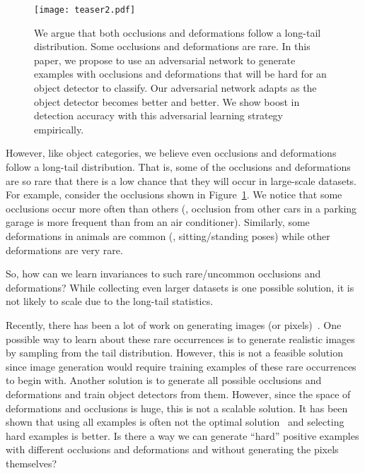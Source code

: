\documentclass[10pt,twocolumn,letterpaper]{article}
\begin{document}
\begin{figure}
    \centering
    \vspace{-0.25in}
    \texttt{[image: teaser2.pdf]}
    \caption{We argue that both occlusions and deformations follow a long-tail distribution. Some occlusions and deformations are rare. In this paper, we propose to use an adversarial network to generate examples with occlusions and deformations that will be hard for an object detector to classify. Our adversarial network adapts as the object detector becomes better and better. We show boost in detection accuracy with this adversarial learning strategy  empirically.}\label{fig:occlusions}
    \vspace{-0.2in}
\end{figure}


However, like object categories, we believe even occlusions and deformations follow a long-tail distribution. That is, some of the occlusions and deformations are so rare that there is a low chance that they will occur in large-scale datasets. 
For example, consider the occlusions shown in Figure~\ref{fig:occlusions}. We notice that some occlusions occur more often than others (\eg, occlusion from other cars in a parking garage is more frequent than from an air conditioner). Similarly, some deformations in animals are common (\eg, sitting/standing poses) while other deformations are very rare.

So, how can we learn invariances to such rare/uncommon occlusions and deformations? While collecting even larger datasets is one possible solution, it is not likely to scale due to the long-tail statistics.

Recently, there has been a lot of work on generating images (or pixels)~\cite{goodfellow2014generative,Denton15,Alec15}. One possible way to learn about these rare occurrences is to generate realistic images by sampling from the tail distribution. However, this is not a feasible solution since image generation would require training examples of these rare occurrences to begin with. Another solution is to generate all possible occlusions and deformations and train object detectors from them. However, since the space of deformations and occlusions is huge, this is not a scalable solution. It has been shown that using all examples is often not the optimal solution~\cite{shrivastavaOHEM,minibatchSVM} and selecting hard examples is better. Is there a way we can generate ``hard'' positive examples with different occlusions and deformations and without generating the pixels themselves?
\end{document}
